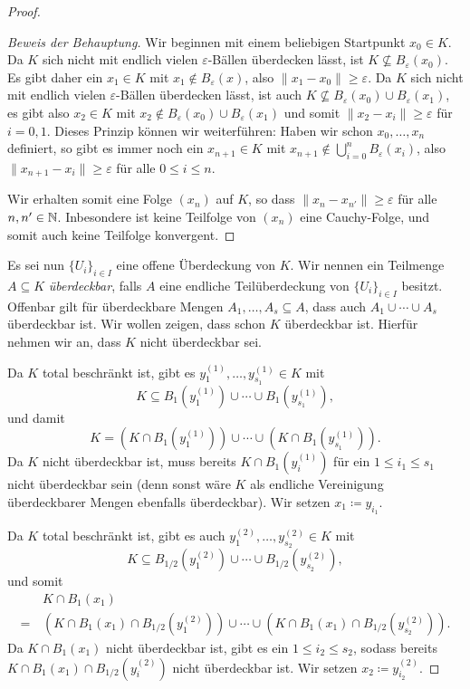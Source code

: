 \documentclass[a4paper,10pt]{article}
\begin{document}
\begin{proof}
\begin{proof}[Beweis der Behauptung]
  Wir beginnen mit einem beliebigen Startpunkt $x_0 \in K$. Da $K$ sich nicht mit endlich vielen $\varepsilon$-Bällen überdecken lässt, ist $K \nsubseteq B_\varepsilon(x_0)$. Es gibt daher ein $x_1 \in K$ mit $x_1 \notin B_\varepsilon(x)$, also $\|x_1 - x_0\| \geq \varepsilon$. Da $K$ sich nicht mit endlich vielen $\varepsilon$-Bällen überdecken lässt, ist auch $K \nsubseteq B_\varepsilon(x_0) \cup B_\varepsilon(x_1)$, es gibt also $x_2 \in K$ mit $x_2 \notin B_\varepsilon(x_0) \cup B_\varepsilon(x_1)$ und somit $\|x_2 - x_i\| \geq \varepsilon$ für $i = 0, 1$. Dieses Prinzip können wir weiterführen: Haben wir schon $x_0, \dotsc, x_n$ definiert, so gibt es immer noch ein $x_{n+1} \in K$ mit $x_{n+1} \notin \bigcup_{i=0}^n B_\varepsilon(x_i)$, also $\|x_{n+1} - x_i\| \geq \varepsilon$ für alle $0 \leq i \leq n$.
  
  Wir erhalten somit eine Folge $(x_n)$ auf $K$, so dass $\|x_n - x_{n'}\| \geq \varepsilon$ für alle $n, n' \in \mathbb{N}$. Inbesondere ist keine Teilfolge von $(x_n)$ eine Cauchy-Folge, und somit auch keine Teilfolge konvergent.
 \end{proof}
 
 
 Es sei nun $\{U_i\}_{i \in I}$ eine offene Überdeckung von $K$. Wir nennen ein Teilmenge $A \subseteq K$ \emph{überdeckbar}, falls $A$ eine endliche Teilüberdeckung von $\{U_i\}_{i \in I}$ besitzt. Offenbar gilt für überdeckbare Mengen $A_1, \dotsc, A_s \subseteq A$, dass auch $A_1 \cup \dotsb \cup A_s$ überdeckbar ist. Wir wollen zeigen, dass schon $K$ überdeckbar ist. Hierfür nehmen wir an, dass $K$ nicht überdeckbar sei.
 
 Da $K$ total beschränkt ist, gibt es $y^{(1)}_1, \dotsc, y^{(1)}_{s_1} \in K$ mit
 \[
  K \subseteq B_1\left(y^{(1)}_1\right) \cup \dotsb \cup B_1\left(y^{(1)}_{s_1}\right),
 \]
 und damit
 \[
  K = \left(K \cap B_1\left(y^{(1)}_1\right)\right) \cup \dotsb \cup \left(K \cap B_1\left(y^{(1)}_{s_1}\right)\right).
 \]
 Da $K$ nicht überdeckbar ist, muss bereits $K \cap B_1(y^{(1)}_i)$ für ein $1 \leq i_1 \leq s_1$ nicht überdeckbar sein (denn sonst wäre $K$ als endliche Vereinigung überdeckbarer Mengen ebenfalls überdeckbar). Wir setzen $x_1 \coloneqq y_{i_1}$.
 
 Da $K$ total beschränkt ist, gibt es auch $y^{(2)}_1, \dotsc, y^{(2)}_{s_2} \in K$ mit
 \[
  K \subseteq B_{1/2}\left(y^{(2)}_1\right) \cup \dotsb \cup B_{1/2}\left(y^{(2)}_{s_2}\right),
 \]
 und somit
 \begin{align*}
   &\,K \cap B_1(x_1) \\
  =&\, \left(K \cap B_1(x_1) \cap B_{1/2}\left(y^{(2)}_1\right)\right) \cup \dotsb \cup \left(K \cap B_1(x_1) \cap B_{1/2}\left(y^{(2)}_{s_2}\right)\right).
 \end{align*}
 Da $K \cap B_1(x_1)$ nicht überdeckbar ist, gibt es ein $1 \leq i_2 \leq s_2$, sodass bereits $K \cap B_1(x_1) \cap B_{1/2}(y^{(2)}_i)$ nicht überdeckbar ist. Wir setzen $x_2 \coloneqq y^{(2)}_{i_2}$.
 

\end{proof}
\end{document}
